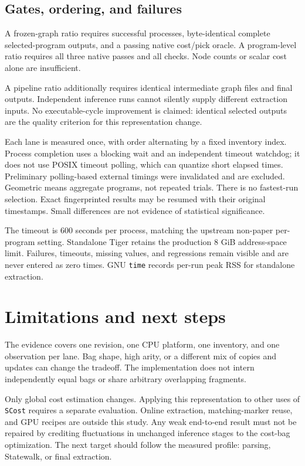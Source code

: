 \documentclass[10pt,a4paper]{article}
\newcommand{\tool}[1]{\texttt{#1}}
\begin{document}
\subsection{Gates, ordering, and failures}
A frozen-graph ratio requires successful processes, byte-identical complete
selected-program outputs, and a passing native cost/pick oracle. A program-level
ratio requires all three native passes and all checks. Node counts or scalar
cost alone are insufficient.

A pipeline ratio additionally requires identical intermediate graph files and
final outputs. Independent inference runs cannot silently supply different
extraction inputs. No executable-cycle improvement is claimed: identical selected
outputs are the quality criterion for this representation change.

Each lane is measured once, with order alternating by a fixed inventory index.
Process completion uses a blocking wait and an independent timeout watchdog;
it does not use POSIX timeout polling, which can quantize short elapsed times.
Preliminary polling-based external timings were invalidated and are excluded.
Geometric means aggregate programs, not repeated trials. There is no fastest-run
selection. Exact fingerprinted results may be resumed with their original
timestamps. Small differences are not evidence of statistical significance.

The timeout is 600 seconds per process, matching the upstream non-paper
per-program setting. Standalone Tiger retains the production 8 GiB
address-space limit. Failures, timeouts, missing values, and regressions remain
visible and are never entered as zero times. GNU \tool{time} records per-run
peak RSS for standalone extraction.

\FloatBarrier
{}

\section{Limitations and next steps}
The evidence covers one revision, one CPU platform, one inventory, and one
observation per lane. Bag shape, high arity, or a different mix of copies and
updates can change the tradeoff. The implementation does not intern independently
equal bags or share arbitrary overlapping fragments.

Only global cost estimation changes. Applying this representation to other uses
of \tool{SCost} requires a separate evaluation. Online extraction, matching-marker
reuse, and GPU recipes are outside this study. Any weak end-to-end result must
not be repaired by crediting fluctuations in unchanged inference stages to
the cost-bag optimization. The next target should follow the measured profile:
parsing, Statewalk, or final extraction.
\end{document}
